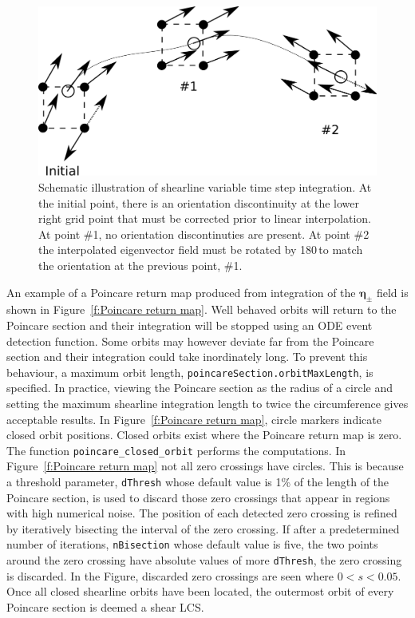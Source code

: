 \documentclass{article}
\begin{document}
\begin{figure}
\begin{center}
\includegraphics[width=\textwidth]{graphics/variable_step_integration}
\end{center}
\caption{Schematic illustration of shearline variable time step integration. At the initial point, there is an orientation discontinuity at the lower right grid point that must be corrected prior to linear interpolation. At point \#1, no orientation discontinuties are present. At point \#2 the interpolated eigenvector field must be rotated by 180\degree\,to match the orientation at the previous point, \#1.}
\label{f:variable step integration}
\end{figure}

An example of a Poincare return map produced from integration of the $\boldsymbol \eta_\pm$ field is shown in Figure~\ref{f:Poincare return map}. Well behaved orbits will return to the Poincare section and their integration will be stopped using an ODE event detection function. Some orbits may however deviate far from the Poincare section and their integration could take inordinately long. To prevent this behaviour, a maximum orbit length, \texttt{poincareSection.\-orbit\-MaxLength}, is specified. In practice, viewing the Poincare section as the radius of a circle and setting the maximum shearline integration length to twice the circumference gives acceptable results. In Figure~\ref{f:Poincare return map}, circle markers indicate closed orbit positions. Closed orbits exist where the Poincare return map is zero. The function \texttt{poincare\_closed\_orbit} performs the computations. In Figure~\ref{f:Poincare return map} not all zero crossings have circles. This is because a threshold parameter, \texttt{dThresh} whose default value is 1\% of the length of the Poincare section, is used to discard those zero crossings that appear in regions with high numerical noise. The position of each detected zero crossing is refined by iteratively bisecting the interval of the zero crossing. If after a predetermined number of iterations, \texttt{nBisection} whose default value is five, the two points around the zero crossing have absolute values of more \texttt{dThresh}, the zero crossing is discarded. In the Figure, discarded zero crossings are seen where $0 < s < 0.05$. Once all closed shearline orbits have been located, the outermost orbit of every Poincare section is deemed a shear LCS.
\end{document}
